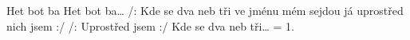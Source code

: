 \begin{TEXT}{Het bot ba}
\SLOKA \hspace{0em} \hspace*{0.75\textwidth}\NL
\hspace{0em} \hspace*{0.75\textwidth}\NL
\hspace{0em} \hspace*{0.75\textwidth}\NL
Het bot ba… 
\SLOKA /: Kde se dva neb tři ve jménu mém sejdou \NL
já uprostřed nich jsem :/ \NL
/: Uprostřed jsem :/ \NL
Kde se dva neb tři…
\SLOKA = 1.
\end{TEXT}
